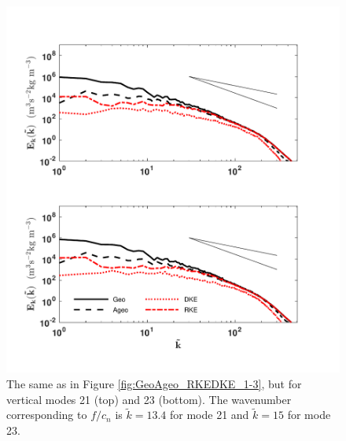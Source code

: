 \begin{figure}[H]
\includegraphics[scale=1]{Chapter4/img/GeoAgeo_RKEDKE_21-23}
\caption{The same as in Figure \ref{fig:GeoAgeo_RKEDKE_1-3}, but for vertical modes 21 (top) and 23 (bottom).  The wavenumber corresponding to $f/c_n$ is $\tilde{k} = 13.4$ for mode 21 and $\tilde{k} = 15$ for mode 23.}
\label{fig:GeoAgeo_RKEDKE_21-23}
\end{figure}

